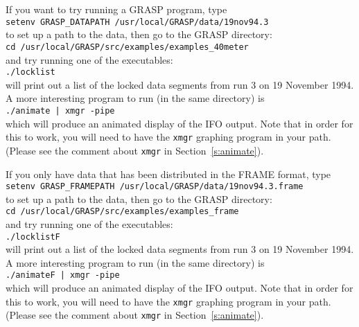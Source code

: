If you want to try running a GRASP program, type\\
{\tt setenv GRASP\_DATAPATH /usr/local/GRASP/data/19nov94.3}\\
to set up a path to the data, then go to the GRASP directory:\\
{\tt cd /usr/local/GRASP/src/examples/examples\_40meter}\\
and try running one of the executables:\\
{\tt ./locklist}\\
will print out a list of the locked data segments from run 3 on 19 November 1994.
A more interesting program to run (in the same directory) is\\
{\tt ./animate | xmgr -pipe}\\
which will produce an animated display of the IFO output.  Note that in
order for this to work, you will need to have the {\tt xmgr} graphing
program in your path.  (Please see the comment about {\tt xmgr} in
Section~\ref{s:animate}).

If you only have data that has been distributed in the FRAME format,
type\\
{\tt setenv GRASP\_FRAMEPATH /usr/local/GRASP/data/19nov94.3.frame}\\
to set up a path to the data, then go to the GRASP directory:\\
{\tt cd /usr/local/GRASP/src/examples/examples\_frame}\\
and try running one of the executables:\\
{\tt ./locklistF}\\
will print out a list of the locked data segments from run 3 on 19 November 1994.
A more interesting program to run (in the same directory) is\\
{\tt ./animateF | xmgr -pipe}\\
which will produce an animated display of the IFO output.  Note that in
order for this to work, you will need to have the {\tt xmgr} graphing
program in your path.  (Please see the comment about {\tt xmgr} in
Section~\ref{s:animate}).

